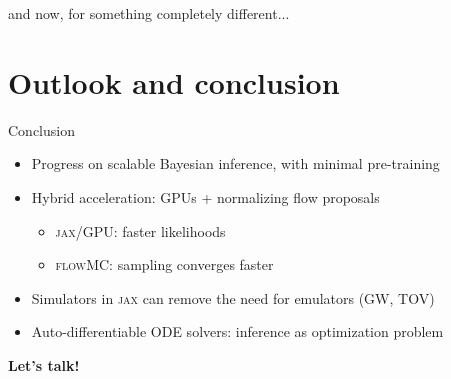 \documentclass[usenames,dvipsnames,t]{beamer}
\begin{document}
\begin{frame}[plain]{}
  \vspace{15mm}
  \huge and now, for something completely different... \normalsize
  \vspace{15mm}
\end{frame}

\section{Outlook and conclusion}

\begin{frame}{Conclusion}
  \def\x{4mm}
  \def\y{1mm}

  \begin{itemize}
    \item Progress on scalable Bayesian inference, with minimal pre-training
 
    \vspace{\x}

    \item Hybrid acceleration: GPUs + normalizing flow proposals
    \begin{itemize}
      \vspace{\y}
      \item \textsc{jax}/GPU: faster likelihoods

      \vspace{\y}

      \item \textsc{flowMC}: sampling converges faster
    \end{itemize}

    \vspace{\x}

    \item Simulators in \textsc{jax} can remove the need for emulators (GW, TOV)

    \vspace{\x}

    \item Auto-differentiable ODE solvers: inference as optimization problem
  \end{itemize}
  
  \vspace{8mm}

  \textbf{Let's talk!}
\end{frame}
\end{document}
